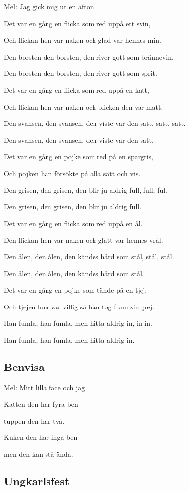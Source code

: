 Mel: Jag gick mig ut en afton\bigskip


Det var en gång en flicka som red uppå ett svin,

Och flickan hon var naken och glad var hennes min.

Den borsten den borsten, den river gott som brännevin.

Den borsten den borsten, den river gott som sprit.\bigskip


Det var en gång en flicka som red uppå en katt,

Och flickan hon var naken och blicken den var matt.

Den svansen, den svansen, den viste var den satt, satt, satt.

Den svansen, den svansen, den viste var den satt.\bigskip


Det var en gång en pojke som red på en spargris,

Och pojken han försökte på alla sätt och vis.

Den grisen, den grisen, den blir ju aldrig full, full, ful.

Den grisen, den grisen, den blir ju aldrig full.\bigskip


Det var en gång en flicka som red uppå en ål.

Den flickan hon var naken och glatt var hennes vrål.

Den ålen, den ålen, den kändes hård som stål, stål, stål.

Den ålen, den ålen, den kändes hård som stål.\bigskip


Det var en gång en pojke som tände på en tjej,

Och tjejen hon var villig så han tog fram sin grej.

Han fumla, han fumla, men hitta aldrig in, in in.

Han fumla, han fumla, men hitta aldrig in. 

\subsection{\textbf{Benvisa}}

Mel: Mitt lilla face och jag\bigskip

Katten den har fyra ben

tuppen den har två.

Kuken den har inga ben

men den kan stå ändå.

\subsection{\textbf{Ungkarlsfest}}

